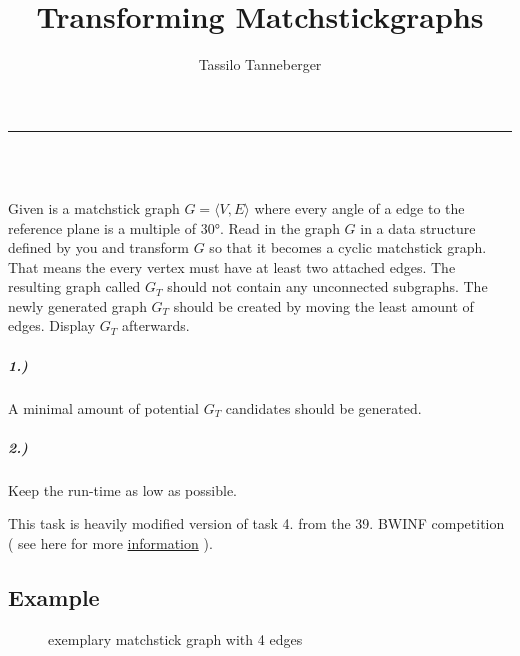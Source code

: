 \documentclass[english,ttfont=true]{tudscrmanual}
\title{Transforming Matchstickgraphs}
\author{Tassilo Tanneberger}
\makeatletter
\newcommand{\linia}{\rule{\linewidth}{1pt}}
\renewcommand{\maketitle}{\begin{center}
\Huge \@title\end{center}
\linia\\
{\large\@author\hfill\@date\\}}
\makeatother
\begin{document}
\maketitle

\noindent Given is a matchstick graph $ G = \langle V, E \rangle $ where every angle of a edge to the reference plane is a multiple of $\ang{30} $. Read in the graph $ G $ in a data structure defined by you and transform $ G $ so that it becomes a cyclic matchstick graph. That means the every vertex must have at least two attached edges. The resulting graph called $ G_T $ should not contain any unconnected subgraphs. The newly generated graph $ G_T $ should be created by moving the least amount of edges. Display $ G_T $ afterwards.

\subparagraph*{1.)} A minimal amount of potential $ G_T $ candidates should be generated.

\subparagraph*{2.)} Keep the run-time as low as possible. \newline

\noindent This task is heavily modified version of task 4. from the 39. BWINF competition ( see here for more \href{https://bwinf.de/fileadmin/bundeswettbewerb/39/Bundeswettbewerb-Aufgabenblatt.pdf}{information} ).

\subsection*{Example}

\begin{figure}[h]
\caption{exemplary matchstick graph with 4 edges}
\center
{}

\end{figure}
\end{document}
